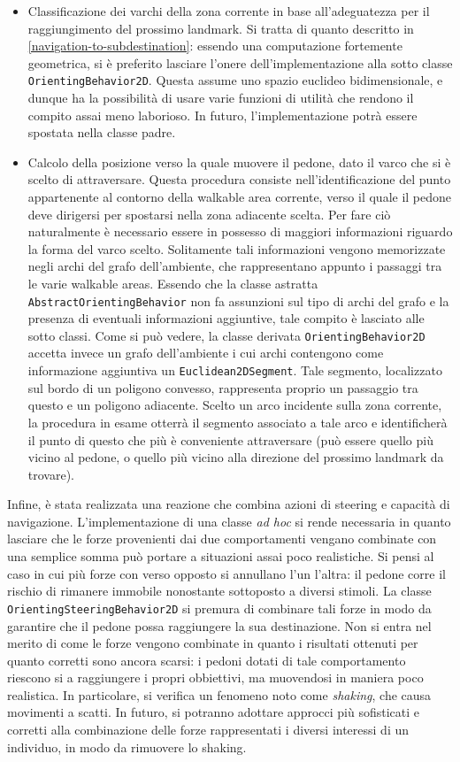 \documentclass[12pt,a4paper,openright,oneside]{book}
\begin{document}
\begin{itemize}
    \item Classificazione dei varchi della zona corrente in base all'adeguatezza per il raggiungimento del prossimo landmark. Si tratta di quanto descritto in \ref{navigation-to-subdestination}: essendo una computazione fortemente geometrica, si è preferito lasciare l'onere dell'implementazione alla sotto classe \texttt{OrientingBehavior2D}. Questa assume uno spazio euclideo bidimensionale, e dunque ha la possibilità di usare varie funzioni di utilità che rendono il compito assai meno laborioso. In futuro, l'implementazione potrà essere spostata nella classe padre.
    \item Calcolo della posizione verso la quale muovere il pedone, dato il varco che si è scelto di attraversare. Questa procedura consiste nell'identificazione del punto appartenente al contorno della walkable area corrente, verso il quale il pedone deve dirigersi per spostarsi nella zona adiacente scelta. Per fare ciò naturalmente è necessario essere in possesso di maggiori informazioni riguardo la forma del varco scelto. Solitamente tali informazioni vengono memorizzate negli archi del grafo dell'ambiente, che rappresentano appunto i passaggi tra le varie walkable areas. Essendo che la classe astratta \texttt{AbstractOrientingBehavior} non fa assunzioni sul tipo di archi del grafo e la presenza di eventuali informazioni aggiuntive, tale compito è lasciato alle sotto classi. Come si può vedere, la classe derivata \texttt{OrientingBehavior2D} accetta invece un grafo dell'ambiente i cui archi contengono come informazione aggiuntiva un \texttt{Euclidean2DSegment}. Tale segmento, localizzato sul bordo di un poligono convesso, rappresenta proprio un passaggio tra questo e un poligono adiacente. Scelto un arco incidente sulla zona corrente, la procedura in esame otterrà il segmento associato a tale arco e identificherà il punto di questo che più è conveniente attraversare (può essere quello più vicino al pedone, o quello più vicino alla direzione del prossimo landmark da trovare).
\end{itemize}
Infine, è stata realizzata una reazione che combina azioni di steering e capacità di navigazione. L'implementazione di una classe \emph{ad hoc} si rende necessaria in quanto lasciare che le forze provenienti dai due comportamenti vengano combinate con una semplice somma può portare a situazioni assai poco realistiche. Si pensi al caso in cui più forze con verso opposto si annullano l'un l'altra: il pedone corre il rischio di rimanere immobile nonostante sottoposto a diversi stimoli. La classe \texttt{OrientingSteeringBehavior2D} si premura di combinare tali forze in modo da garantire che il pedone possa raggiungere la sua destinazione. Non si entra nel merito di come le forze vengono combinate in quanto i risultati ottenuti per quanto corretti sono ancora scarsi: i pedoni dotati di tale comportamento riescono si a raggiungere i propri obbiettivi, ma muovendosi in maniera poco realistica. In particolare, si verifica un fenomeno noto come \emph{shaking}, che causa movimenti a scatti. In futuro, si potranno adottare approcci più sofisticati e corretti alla combinazione delle forze rappresentati i diversi interessi di un individuo, in modo da rimuovere lo shaking.
\end{document}
